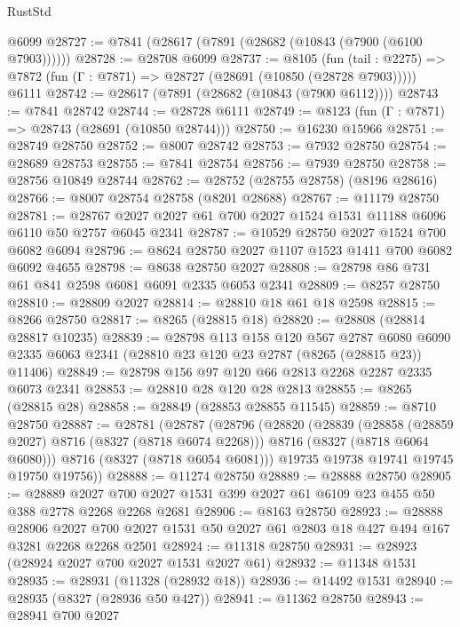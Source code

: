 \begin{lexlean}{RustStd}
\begin{coremodule}
    @6099
@28727 := @7841 (@28617 (@7891 (@28682 (@10843 (@7900 (@6100 @7903))))))
@28728 := @28708 @6099
@28737 := @8105
    (fun (tail : @2275) => @7872 (fun (Γ : @7871) => @28727 (@28691 (@10850 (@28728 @7903)))))
    @6111
@28742 := @28617 (@7891 (@28682 (@10843 (@7900 @6112))))
@28743 := @7841 @28742
@28744 := @28728 @6111
@28749 := @8123 (fun (Γ : @7871) => @28743 (@28691 (@10850 @28744)))
@28750 := @16230 @15966
@28751 := @28749 @28750
@28752 := @8007 @28742
@28753 := @7932 @28750
@28754 := @28689 @28753
@28755 := @7841 @28754
@28756 := @7939 @28750
@28758 := @28756 @10849 @28744
@28762 := @28752 (@28755 @28758) (@8196 @28616)
@28766 := @8007 @28754 @28758 (@8201 @28688)
@28767 := @11179 @28750
@28781 := @28767 @2027 @2027 @61 @700 @2027 @1524 @1531 @11188 @6096 @6110 @50 @2757 @6045 @2341
@28787 := @10529 @28750 @2027 @1524 @700 @6082 @6094
@28796 := @8624 @28750 @2027 @1107 @1523 @1411 @700 @6082 @6092 @4655
@28798 := @8638 @28750 @2027
@28808 := @28798 @86 @731 @61 @841 @2598 @6081 @6091 @2335 @6053 @2341
@28809 := @8257 @28750
@28810 := @28809 @2027
@28814 := @28810 @18 @61 @18 @2598
@28815 := @8266 @28750
@28817 := @8265 (@28815 @18)
@28820 := @28808 (@28814 @28817 @10235)
@28839 := @28798
    @113
    @158
    @120
    @567
    @2787
    @6080
    @6090
    @2335
    @6063
    @2341
    (@28810 @23 @120 @23 @2787 (@8265 (@28815 @23)) @11406)
@28849 := @28798 @156 @97 @120 @66 @2813 @2268 @2287 @2335 @6073 @2341
@28853 := @28810 @28 @120 @28 @2813
@28855 := @8265 (@28815 @28)
@28858 := @28849 (@28853 @28855 @11545)
@28859 := @8710 @28750
@28887 := @28781
    (@28787
      (@28796
        (@28820
          (@28839
            (@28858 (@28859 @2027) @8716 (@8327 (@8718 @6074 @2268)))
            @8716
            (@8327 (@8718 @6064 @6080)))
          @8716
          (@8327 (@8718 @6054 @6081)))
        @19735
        @19738
        @19741
        @19745
        @19750
        @19756))
@28888 := @11274 @28750
@28889 := @28888 @28750
@28905 := @28889
    @2027
    @700
    @2027
    @1531
    @399
    @2027
    @61
    @6109
    @23
    @455
    @50
    @388
    @2778
    @2268
    @2268
    @2681
@28906 := @8163 @28750
@28923 := @28888
    @28906
    @2027
    @700
    @2027
    @1531
    @50
    @2027
    @61
    @2803
    @18
    @427
    @494
    @167
    @3281
    @2268
    @2268
    @2501
@28924 := @11318 @28750
@28931 := @28923 (@28924 @2027 @700 @2027 @1531 @2027 @61)
@28932 := @11348 @1531
@28935 := @28931 (@11328 (@28932 @18))
@28936 := @14492 @1531
@28940 := @28935 (@8327 (@28936 @50 @427))
@28941 := @11362 @28750
@28943 := @28941 @700 @2027

\end{coremodule}
\end{lexlean}
